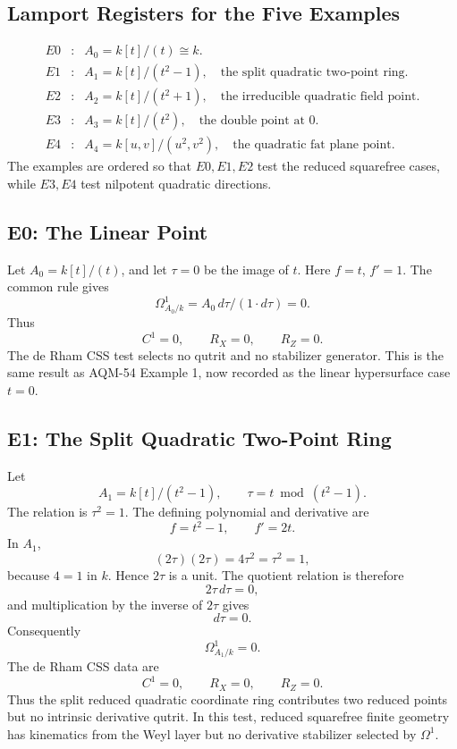 \subsection{Lamport Registers for the Five Examples}
\[
\begin{array}{rcl}
E0&:&A_0=k[t]/(t)\cong k.\\
E1&:&A_1=k[t]/(t^2-1),\quad\text{the split quadratic two-point ring.}\\
E2&:&A_2=k[t]/(t^2+1),\quad\text{the irreducible quadratic field point.}\\
E3&:&A_3=k[t]/(t^2),\quad\text{the double point at }0.\\
E4&:&A_4=k[u,v]/(u^2,v^2),\quad\text{the quadratic fat plane point.}
\end{array}
\]
The examples are ordered so that \(E0,E1,E2\) test the reduced squarefree
cases, while \(E3,E4\) test nilpotent quadratic directions.
\subsection{E0: The Linear Point}
Let \(A_0=k[t]/(t)\), and let \(\tau=0\) be the image of \(t\).  Here
\(f=t\), \(f'=1\).  The common rule gives
\[
  \Omega^1_{A_0/k}=A_0\,d\tau/(1\cdot d\tau)=0.
\]
Thus
\[
  C^1=0,\qquad R_X=0,\qquad R_Z=0.
\]
The de Rham CSS test selects no qutrit and no stabilizer generator.  This is
the same result as AQM-54 Example 1, now recorded as the linear hypersurface
case \(t=0\).
\subsection{E1: The Split Quadratic Two-Point Ring}
Let
\[
  A_1=k[t]/(t^2-1),\qquad \tau=t\bmod(t^2-1).
\]
The relation is \(\tau^2=1\).  The defining polynomial and derivative are
\[
  f=t^2-1,\qquad f'=2t.
\]
In \(A_1\),
\[
  (2\tau)(2\tau)=4\tau^2=\tau^2=1,
\]
because \(4=1\) in \(k\).  Hence \(2\tau\) is a unit.  The quotient relation
is therefore
\[
  2\tau\,d\tau=0,
\]
and multiplication by the inverse of \(2\tau\) gives
\[
  d\tau=0.
\]
Consequently
\[
  \Omega^1_{A_1/k}=0.
\]
The de Rham CSS data are
\[
  C^1=0,\qquad R_X=0,\qquad R_Z=0.
\]
Thus the split reduced quadratic coordinate ring contributes two reduced
points but no intrinsic derivative qutrit.  In this test, reduced squarefree
finite geometry has kinematics from the Weyl layer but no derivative
stabilizer selected by \(\Omega^1\).
